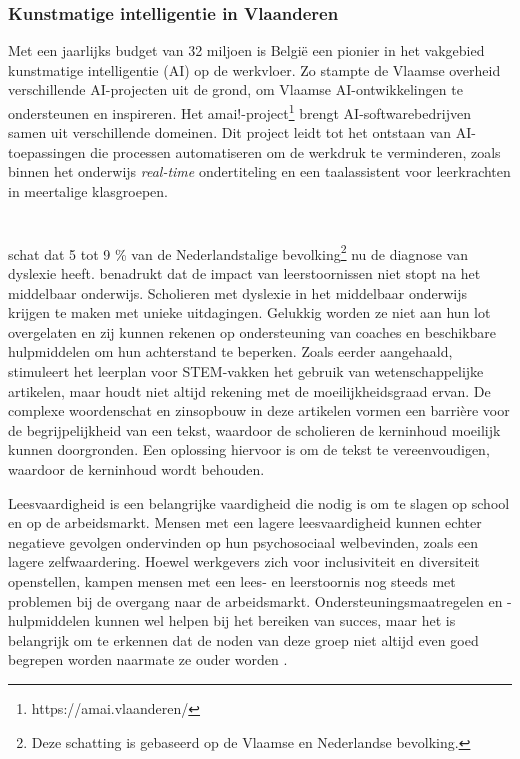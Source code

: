 \subsubsection{Kunstmatige intelligentie in Vlaanderen}
Met een jaarlijks budget van 32 miljoen is België een pionier \autocite{Crevits2022} in het vakgebied kunstmatige intelligentie (AI) op de werkvloer.  Zo stampte de Vlaamse overheid verschillende AI-projecten uit de grond, om Vlaamse AI-ontwikkelingen te ondersteunen en inspireren. Het amai!-project\footnote{https://amai.vlaanderen/}  brengt AI-softwarebedrijven samen uit verschillende domeinen. Dit project leidt tot het ontstaan van AI-toepassingen die processen automatiseren om de werkdruk te verminderen, zoals binnen het onderwijs \textit{real-time} ondertiteling en een taalassistent voor leerkrachten in meertalige klasgroepen.

\section{}%
\label{sec:probleemstelling}

\textcite{Ghesquiere2018} schat dat 5 tot 9 \% van de Nederlandstalige bevolking\footnote{Deze schatting is gebaseerd op de Vlaamse en Nederlandse bevolking.} nu de diagnose van dyslexie heeft. \textcite{Lissens2020} benadrukt dat de impact van leerstoornissen niet stopt na het middelbaar onderwijs. Scholieren met dyslexie in het middelbaar onderwijs krijgen te maken met unieke uitdagingen. Gelukkig worden ze niet aan hun lot overgelaten en zij kunnen rekenen op ondersteuning van coaches en beschikbare hulpmiddelen om hun achterstand te beperken. Zoals eerder aangehaald, stimuleert het leerplan voor STEM-vakken het gebruik van wetenschappelijke artikelen, maar houdt niet altijd rekening met de moeilijkheidsgraad ervan. De complexe woordenschat en zinsopbouw in deze artikelen vormen een barrière voor de begrijpelijkheid van een tekst, waardoor de scholieren de kerninhoud moeilijk kunnen doorgronden. Een oplossing hiervoor is om de tekst te vereenvoudigen, waardoor de kerninhoud wordt behouden.

Leesvaardigheid is een belangrijke vaardigheid die nodig is om te slagen op school en op de arbeidsmarkt. Mensen met een lagere leesvaardigheid kunnen echter negatieve gevolgen ondervinden op hun psychosociaal welbevinden, zoals een lagere zelfwaardering. Hoewel werkgevers zich voor inclusiviteit en diversiteit openstellen, kampen mensen met een lees- en leerstoornis nog steeds met problemen bij de overgang naar de arbeidsmarkt. Ondersteuningsmaatregelen en -hulpmiddelen kunnen wel helpen bij het bereiken van succes, maar het is belangrijk om te erkennen dat de noden van deze groep niet altijd even goed begrepen worden naarmate ze ouder worden \autocite{Lissens2020}.

